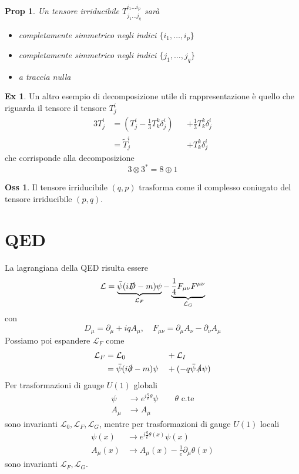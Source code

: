 \documentclass[10pt,a4paper]{article}
\newtheorem{prop}{Prop}[section]
\theoremstyle{definition}
\newtheorem{observation}{Oss}[section]
\newtheorem{example}{Ex}[section]
\newcommand{\lagr}{\mathcal{L}} %
\begin{document}
\begin{prop}
    Un tensore irriducibile $T_{j_1 \dots j_q}^{i_1 \dots i_p}$ sarà
    \begin{itemize}
        \item completamente simmetrico negli indici $\{i_1, \dots, i_p\}$
        \item completamente simmetrico negli indici $\{j_1, \dots, j_q\}$
        \item a traccia nulla
    \end{itemize}
\end{prop}

\begin{example}
    Un altro esempio di decomposizione utile di rappresentazione è quello che riguarda il tensore il tensore $T_j^i$
    \begin{alignat*}{3}
        T^i_j &= (T^i_j - \frac13 T_k^k \delta^i_j) &&+ \frac13 T_k^k \delta^i_j \\
        &= \tilde{T}^i_j &&+ T_k^k \delta^i_j 
    \end{alignat*}
    che corrisponde alla decomposizione 
    \[
    3 \otimes 3^* = 8 \oplus 1    
    \]
\end{example}

\begin{observation}
    Il tensore irriducibile $(q, p)$ trasforma come il complesso coniugato del tensore irriducibile $(p, q)$.
\end{observation}

\section{QED}
La lagrangiana della QED risulta essere
\[
    \lagr = \underbrace{\bar{\psi}(i\slashed{D}- m)\psi}_{\lagr_F} - \underbrace{\frac14 F_{\mu \nu}F^{\mu \nu}}_{\lagr_G}
\]
con
\[
D_\mu = \partial_\mu + iqA_\mu, \quad F_{\mu \nu} = \partial_\mu A_\nu - \partial_\nu A_\mu    
\]
Possiamo poi espandere $\lagr_F$ come
\begin{alignat*}{3}
    \lagr_F &= \lagr_0 &&+ \lagr_I \\
    &= \bar{\psi}(i\slashed{\partial}-m)\psi &&+ (-q\bar{\psi}\slashed{A}\psi)
\end{alignat*}
Per trasformazioni di gauge $U(1)$ globali
\begin{align*}
    \psi &\to e^{i\frac{q}{e}\theta}\psi \qquad \theta \text{ c.te} \\
    A_\mu &\to A_\mu
\end{align*}
sono invarianti $\lagr_0, \lagr_F, \lagr_G$, mentre per trasformazioni di gauge $U(1)$ locali
\begin{align*}
    \psi(x) &\to e^{i\frac{q}{e}\theta(x)}\psi(x)\\
    A_\mu(x) &\to A_\mu(x) - \frac{1}{e}\partial_\mu\theta(x)
\end{align*}
sono invarianti $\lagr_F, \lagr_G$.
\end{document}

